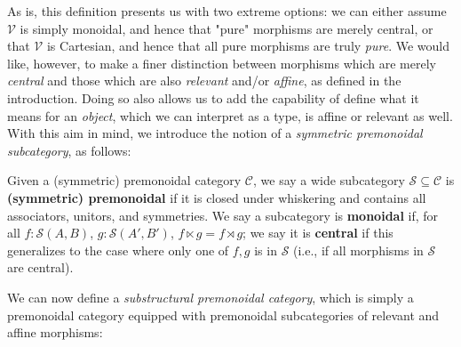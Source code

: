 \documentclass[acmsmall,screen,review]{acmart}
\newcommand{\mc}[1]{\ensuremath{\mathcal{#1}}}
\newcommand{\mb}[1]{\ensuremath{\mathbf{#1}}}
\newcommand{\ms}[1]{\ensuremath{\mathsf{#1}}}
\begin{document}
As is, this definition presents us with two extreme options: we can either
assume \(\mc{V}\) is simply monoidal, and hence that "pure" morphisms are merely
central, or that \(\mc{V}\) is Cartesian, and hence that all pure morphisms are
truly \textit{pure}. We would like, however, to make a finer distinction between
morphisms which are merely \textit{central} and those which are also
\textit{relevant} and/or \textit{affine}, as defined in the introduction. Doing
so also allows us to add the capability of define what it means for an
\textit{object}, which we can interpret as a type, is affine or relevant as
well. With this aim in mind, we introduce the notion of a \textit{symmetric
premonoidal subcategory}, as follows:
\begin{definition}
  Given a (symmetric) premonoidal category \(\mc{C}\), we say a wide subcategory
  \(\mc{S} \subseteq \mc{C}\) is \textbf{(symmetric) premonoidal} if it is
  closed under whiskering and contains all associators, unitors, and symmetries.
  We say a subcategory is \textbf{monoidal} if, for all \(f: \mc{S}(A, B)\),
  \(g: \mc{S}(A', B')\), \(f \ltimes g = f \rtimes g\); we say it is
  \textbf{central} if this generalizes to the case where only one of \(f, g\) is
  in \(\mc{S}\) (i.e., if all morphisms in \(\mc{S}\) are central).
\end{definition} 
%
%
%
We can now define a \textit{substructural premonoidal category}, which is simply
a premonoidal category equipped with premonoidal subcategories of relevant and
affine morphisms:
\end{document}
